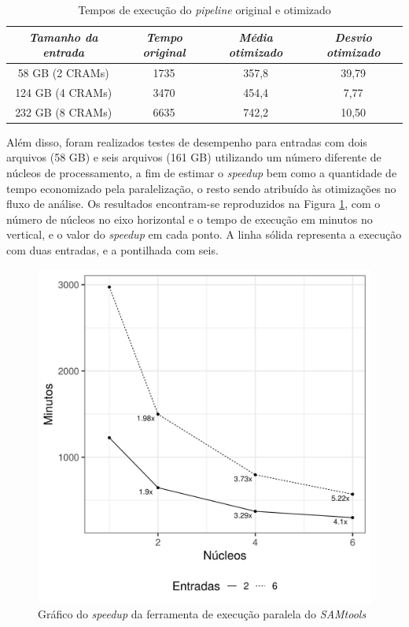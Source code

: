 \documentclass[cic,tc]{iiufrgs}
\begin{document}
\begin{table}[h]
    \caption{Tempos de execução do \textit{pipeline} original e otimizado}
    \centering
        \begin{tabular}{c|c|c|c}
          \hline
          \textit{Tamanho da entrada}  &   \textit{Tempo original}  & \textit{Média otimizado} & \textit{Desvio otimizado} \\
          \hline
          \hline
          58 GB (2 CRAMs)  & 1735 & 357,8 & 39,79  \\
          124 GB (4 CRAMs) & 3470 & 454,4 & 7,77   \\
          232 GB (8 CRAMs) & 6635 & 742,2 &  10,50 \\
          \hline
        \end{tabular}
    \label{tbl:SAMtools}
\end{table}

Além disso, foram realizados testes de desempenho para entradas com dois arquivos
(58 GB) e seis arquivos (161 GB) utilizando um número diferente de núcleos de
processamento, a fim de estimar o \textit{speedup} bem como a quantidade de
tempo economizado pela paralelização, o resto sendo atribuído às otimizações no
fluxo de análise. Os resultados encontram-se reproduzidos na Figura
\ref{fig:speedup}, com o número de núcleos no eixo horizontal e o tempo de
execução em minutos no vertical, e o valor do \textit{speedup} em cada ponto. A
linha sólida representa a execução com duas entradas, e a pontilhada com seis.

\begin{figure}
  \caption{Gráfico do \textit{speedup} da ferramenta de execução paralela do \textit{SAMtools}}
    \begin{center}
      \includegraphics[width=0.55\linewidth]{img/speedup.png}
    \end{center}
    \label{fig:speedup}
\end{figure}
\end{document}
